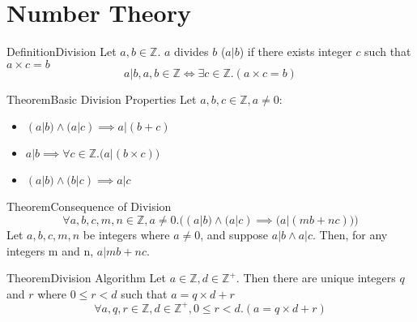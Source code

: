 \documentclass{MathNotes}
\newenvironment{definition}[1]{\begin{RedBox}{Definition}{#1}}{\end{RedBox}}
\newenvironment{theorem}[1]{\begin{GrayBox}{Theorem}{#1}}{\end{GrayBox}}
\begin{document}
\newpage
\section{Number Theory}\label{sec:number-theory}
\begin{definition}{Division}\label{def:division}
	Let $a,b\in\mathbb{Z}$. $a$ divides $b$ ($a|b$) if there exists integer $c$ such that $a\times c=b$
	\[a|b,a,b\in\mathbb{Z}\iff\exists c\in\mathbb{Z}.(a\times c=b)\]
\end{definition}

\begin{theorem}{Basic Division Properties}\label{th:basic-division-properties}
	Let $a,b,c\in\mathbb{Z},a\neq 0$:
	\begin{itemize}
		\item $\displaystyle (a|b)\land(a|c)\implies a|(b+c)$
		\item $\displaystyle a|b\implies \forall c\in\mathbb{Z}.\big(a|(b\times c)\big)$
		\item $\displaystyle (a|b)\land(b|c)\implies a|c$
	\end{itemize}
\end{theorem}

\begin{theorem}{Consequence of Division}\label{th:division-consequence}
	\[\forall a,b,c,m,n\in\mathbb{Z},a\neq0.\Big((a|b)\land(a|c)\implies\big(a|(mb+nc)\big)\Big)\]
	Let $a,b,c,m,n$ be integers where $a\neq0$, and suppose $a|b\land a|c$.
	Then, for any integers m and n, $a|mb+nc$.
\end{theorem}

\begin{theorem}{Division Algorithm}\label{th:division-algorithm}
	Let $a\in\mathbb{Z},d\in\mathbb{Z}^+$. Then there are unique integers $q$
	and $r$ where $0\leq r<d$ such that $a=q\times d+r$
	\[\forall a,q,r\in\mathbb{Z},d\in\mathbb{Z}^+,0\leq r<d.(a=q\times d+r)\]
\end{theorem}
\end{document}

